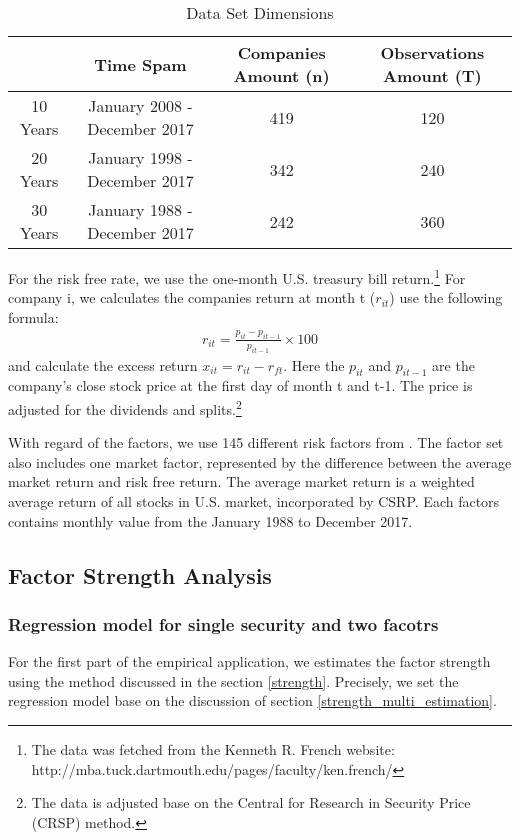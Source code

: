 \begin{table}[h]
		\caption{Data Set Dimensions}
			\label{Data_set}
	\begin{tabular}{c|ccc}
		\hline
		& Time Spam                    & Companies Amount (n) & Observations Amount (T) \\ \hline
		10 Years & January 2008 - December 2017 & 419                  & 120                     \\
		20 Years & January 1998 - December 2017 & 342                  & 240                     \\
		30 Years & January 1988 - December 2017 & 242                  & 360                     \\ \hline
	\end{tabular}
\end{table}
For the risk free rate, we use the one-month U.S. treasury bill return.\footnote{ The data was fetched from the Kenneth R. French website: http://mba.tuck.dartmouth.edu/pages/faculty/ken.french/}
For company i, we calculates the companies return at month t ($r_{it}$) use the following formula:
\begin{align*}
r_{it} = \frac{p_{i t} - p_{i t-1}}{p_{i t-1}}\times 100
\end{align*}
and calculate the excess return $x_{it} = r_{it} - r_{ft}$.
Here the $p_{it}$ and $p_{i t-1}$ are the company's close stock price at the first day of month t and t-1.
The price is adjusted for the dividends and splits.\footnote{The data is adjusted base on the Central for Research in Security Price (CRSP) method.}

With regard of the factors, we use 145 different risk factors from .
The factor set also includes one market factor, represented by the difference between the average market return and risk free return.
The average market return is a weighted average return of all stocks in U.S. market, incorporated by CSRP.
Each factors contains monthly value from the January 1988 to December 2017.

\subsection{Factor Strength Analysis}

\subsubsection{Regression model for single security and two facotrs}
For the first part of the empirical application, we estimates the factor strength using the method discussed in the section \ref{strength}.
Precisely, we set the regression model base on the discussion of section \ref{strength_multi_estimation}.

